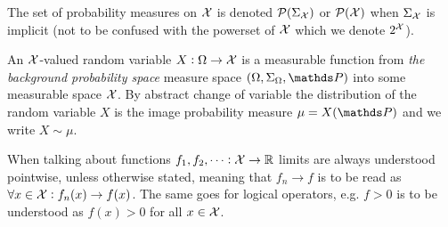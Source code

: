 The set of probability measures on $\mathcal{X}$ is denoted
$\mathcal{P}(\Sigma_\mathcal{X})$ or $\mathcal{P}(\mathcal{X})$ when $\Sigma_\mathcal{X}$ is implicit
(not to be confused with the powerset of $\mathcal{X}$
which we denote $2^{\mathcal{X}}$).

An $\mathcal{X}$-valued random variable $X : \Omega \to \mathcal{X}$ is a
measurable function from \emph{the background probability space}
measure space $(\Omega, \Sigma_\Omega, \Prob)$ into some measurable
space $\mathcal{X}$.
By abstract change of variable the distribution of the random variable $X$
is the image probability measure $\mu = X(\Prob)$ and we write
$X \sim \mu$.

When talking about functions $f_1, f_2, \dots : \mathcal{X} \to \mathbb{R}$
limits are always understood pointwise, unless otherwise stated,
meaning that $f_n \to f$ is to be read as
$\forall x \in \mathcal{X} : f_n(x) \to f(x)$.
The same goes for logical operators, e.g. $f > 0$ is to be understood
as $f(x) > 0$ for all $x \in \mathcal{X}$.


